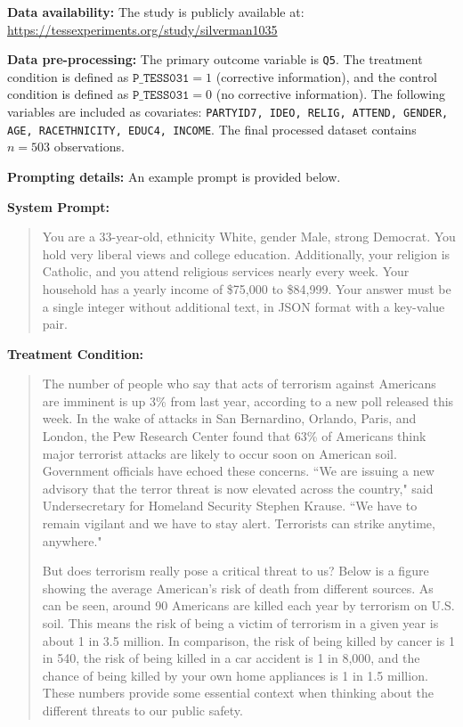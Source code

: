 \textbf{Data availability:}  The study is publicly available at: \url{https://tessexperiments.org/study/silverman1035}


\textbf{Data pre-processing:} The primary outcome variable is \texttt{Q5}. The treatment condition is defined as $\texttt{P\_TESS031} =1$ (corrective information), and the control condition is defined as $\texttt{P\_TESS031} =0$ (no corrective information). The following variables are included as covariates: \texttt{PARTYID7, IDEO, RELIG, ATTEND, GENDER, AGE,
       RACETHNICITY, EDUC4, INCOME}. The final processed dataset contains $n=503$ observations.


\textbf{Prompting details:} 
An example prompt is provided below.


\begin{tcolorbox}[
   title=Example Prompt,
   fonttitle=\bfseries,
   colback=white,
   colframe=pierCite,
   width=\textwidth,
   left=5pt,
   right=5pt
]
\textbf{System Prompt:}
\begin{quotation}
You are a 33-year-old, ethnicity White, gender Male, strong Democrat. You hold very liberal views and college education. Additionally, your religion is Catholic, and you attend religious services nearly every week. Your household has a yearly income of \$75,000 to \$84,999. Your answer must be a single integer without additional text, in JSON format with a key-value pair.
\end{quotation}

\textbf{Treatment Condition:}
\begin{quotation}
The number of people who say that acts of terrorism against Americans are imminent is up 3\% from last year, according to a new poll released this week. In the wake of attacks in San Bernardino, Orlando, Paris, and London, the Pew Research Center found that 63\% of Americans think major terrorist attacks are likely to occur soon on American soil. Government officials have echoed these concerns. ``We are issuing a new advisory that the terror threat is now elevated across the country," said Undersecretary for Homeland Security Stephen Krause. ``We have to remain vigilant and we have to stay alert. Terrorists can strike anytime, anywhere." 

But does terrorism really pose a critical threat to us? Below is a figure showing the average American's risk of death from different sources. 
As can be seen, around 90 Americans are killed each year by terrorism on U.S. soil. This means the risk of being a victim of terrorism in a given year is about 1 in 3.5 million. In comparison, the risk of being killed by cancer is 1 in 540, the risk of being killed in a car accident is 1 in 8,000, and the chance of being killed by your own home appliances is 1 in 1.5 million. These numbers provide some essential context when thinking about the different threats to our public safety.
\end{quotation}


\end{tcolorbox}
